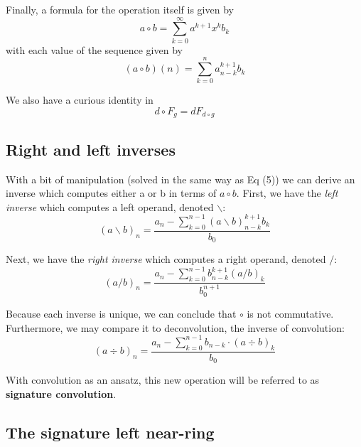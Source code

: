 \documentclass{article}
\begin{document}
\noindent Finally, a formula for the operation itself is given by \begin{equation}a \circ b = \sum_{k=0}^{\infty} a^{k+1} x^k b_k\label{sigconv}\end{equation} with each value of the sequence given by \begin{equation}(a \circ b)(n) = \sum_{k=0}^{n} a_{n-k}^{k+1}b_{k}\end{equation}

\noindent We also have a curious identity in \begin{equation}d \circ F_g = dF_{d \circ g}\end{equation}

\subsection{Right and left inverses}

With a bit of manipulation (solved in the same way as  Eq (5)) we can derive an inverse which computes either a or b in terms of $a \circ b$. First, we have the \textit{left inverse} which computes a left operand, denoted $\backslash$: \begin{equation}(a \backslash b)_{n} = \frac{a_{n} - \displaystyle \sum_{k=0}^{n-1} (a \backslash b)_{n-k}^{k+1} b_{k}}{b_{0}}\end{equation}

\noindent Next, we have the \textit{right inverse} which computes a right operand, denoted $/$: \begin{equation}(a / b)_{n} = \frac{a_{n} - \displaystyle \sum_{k=0}^{n-1} b_{n-k}^{k+1} (a/b)_{k}}{b_{0}^{n+1}}\end{equation}

\noindent Because each inverse is unique, we can conclude that $\circ$ is not commutative. Furthermore, we may compare it to deconvolution, the inverse of convolution: \begin{equation}(a \div b)_{n} = \frac{a_{n} - \displaystyle \sum_{k=0}^{n-1}  b_{n-k} \cdot (a \div b)_{k}}{b_{0}}\end{equation}

\noindent With convolution as an ansatz, this new operation will be referred to as \textbf{signature convolution}.

\subsection{The signature left near-ring}
\end{document}
